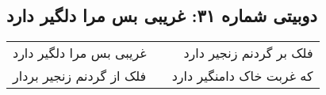 \begin{center}
\section*{دوبیتی شماره ۳۱: غریبی بس مرا دلگیر دارد}
\label{sec:031}
\begin{longtable}{l p{0.5cm} r}
غریبی بس مرا دلگیر دارد
&&
فلک بر گردنم زنجیر دارد
\\
فلک از گردنم زنجیر بردار
&&
که غربت خاک دامنگیر دارد
\\
\end{longtable}
\end{center}
